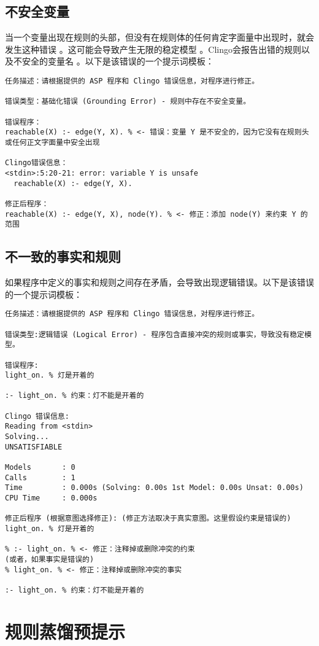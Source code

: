 \subsection{不安全变量}
当一个变量出现在规则的头部，但没有在规则体的任何肯定字面量中出现时，就会发生这种错误 。这可能会导致产生无限的稳定模型 。Clingo会报告出错的规则以及不安全的变量名 。以下是该错误的一个提示词模板：
\begin{lstlisting}
任务描述：请根据提供的 ASP 程序和 Clingo 错误信息，对程序进行修正。

错误类型：基础化错误 (Grounding Error) - 规则中存在不安全变量。

错误程序：
reachable(X) :- edge(Y, X). % <- 错误：变量 Y 是不安全的，因为它没有在规则头或任何正文字面量中安全出现

Clingo错误信息：
<stdin>:5:20-21: error: variable Y is unsafe
  reachable(X) :- edge(Y, X).

修正后程序：
reachable(X) :- edge(Y, X), node(Y). % <- 修正：添加 node(Y) 来约束 Y 的范围
\end{lstlisting}
\subsection{不一致的事实和规则}
如果程序中定义的事实和规则之间存在矛盾，会导致出现逻辑错误。以下是该错误的一个提示词模板：
\begin{lstlisting}
任务描述：请根据提供的 ASP 程序和 Clingo 错误信息，对程序进行修正。

错误类型:逻辑错误 (Logical Error) - 程序包含直接冲突的规则或事实，导致没有稳定模型。

错误程序:
light_on. % 灯是开着的

:- light_on. % 约束：灯不能是开着的

Clingo 错误信息:
Reading from <stdin>
Solving...
UNSATISFIABLE

Models       : 0
Calls        : 1
Time         : 0.000s (Solving: 0.00s 1st Model: 0.00s Unsat: 0.00s)
CPU Time     : 0.000s

修正后程序 (根据意图选择修正): (修正方法取决于真实意图。这里假设约束是错误的)
light_on. % 灯是开着的

% :- light_on. % <- 修正：注释掉或删除冲突的约束
(或者，如果事实是错误的)
% light_on. % <- 修正：注释掉或删除冲突的事实

:- light_on. % 约束：灯不能是开着的
\end{lstlisting}
\section{规则蒸馏预提示}
\label{appendix:preprompt}
